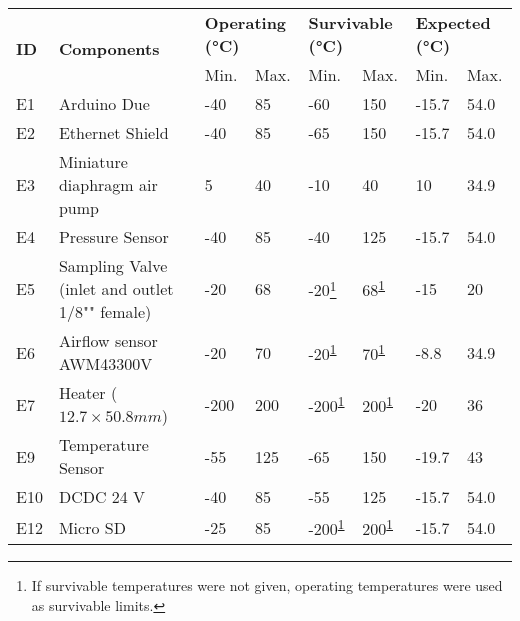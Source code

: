



\begin{longtable}{|m{1cm}|m{3.5cm}|m{1.3cm}|m{1.3cm}|m{1.4cm}|m{1.3cm}|m{1.3cm}|m{1.3cm}|}
\hline
\multirow{2}{*}{\textbf{ID}} & \multirow{2}{*}{\textbf{Components}}                                 & \multicolumn{2}{l|}{\textbf{Operating (°C)}} & \multicolumn{2}{l|}{\textbf{Survivable (°C)}} & \multicolumn{2}{l|}{\textbf{Expected (°C)}} \\ \cline{3-8} &   & Min.  & Max.  & Min.  & Max.  &  Min.   &  Max.            \\ \hline
E1 & Arduino Due & -40 & 85 & -60 & 150 & -15.7 & 54.0 \\ \hline
E2 & Ethernet Shield & -40 & 85 & -65 & 150 & -15.7 & 54.0 \\ \hline
E3 & Miniature diaphragm air pump & 5 & 40 & -10 & 40 & 10 & 34.9 \\ \hline
E4 & Pressure Sensor & -40 & 85 & -40 & 125 & -15.7 & 54.0 \\ \hline
E5 & Sampling Valve (inlet and outlet 1/8"" female) & -20 & 68 & -20\footnote{If survivable temperatures were not given, operating temperatures were used as survivable limits.\label{fn:erik}} & 68\textsuperscript{\ref{fn:erik}} & -15 & 20 \\ \hline
E6 & Airflow sensor AWM43300V & -20 & 70 & -20\textsuperscript{\ref{fn:erik}} & 70\textsuperscript{\ref{fn:erik}} & -8.8 & 34.9 \\ \hline
E7 & Heater ($12.7\times 50.8 mm$) & -200 & 200 & -200\textsuperscript{\ref{fn:erik}} & 200\textsuperscript{\ref{fn:erik}} & -20 & 36 \\ \hline
E9 & Temperature Sensor & -55 & 125 & -65 & 150 & -19.7 & 43 \\ \hline
E10 & DCDC 24 V & -40 & 85 & -55 & 125 & -15.7 & 54.0 \\ \hline
E12 & Micro SD & -25 & 85 & -200\textsuperscript{\ref{fn:erik}} & 200\textsuperscript{\ref{fn:erik}} & -15.7 & 54.0 \\ \hline

\end{longtable}
